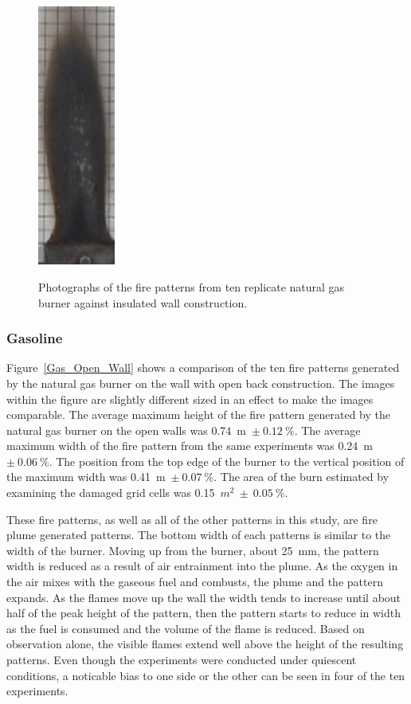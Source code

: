 \documentclass[twoside]{uocthesis}
\begin{document}
\begin{figure}[p]
	\includegraphics[width=1.0in]{../Figures/GBNG33} \\

	\caption[Photographs of the fire patterns from ten replicate natural gas burner against insulated wall construction]{Photographs of the fire patterns from ten replicate natural gas burner against insulated wall construction.}
	\label{NG_Insulated_Wall}
\end{figure}



\subsubsection{Gasoline}

Figure~\ref{Gas_Open_Wall} shows a comparison of the ten fire patterns generated by the natural gas burner on the wall with open back construction.  The images within the figure are slightly different sized in an effect to make the images comparable.
The average maximum height of the fire pattern generated by the natural gas burner on the open walls was 0.74~m~$\pm~0.12~\%$.  The average maximum width of the fire pattern from the same experiments was 0.24~m~$\pm~0.06~\%$.  The position from the top edge of the burner to the vertical position of the maximum width was 0.41~m~$\pm~0.07~\%$. The area of the burn estimated by examining the damaged grid cells was 0.15~$m^2~\pm~0.05~\%$.  

These fire patterns, as well as all of the other patterns in this study, are fire plume generated patterns. The bottom width of each patterns is similar to the width of the burner. Moving up from the burner, about 25~mm, the pattern width is reduced as a result of air entrainment into the plume.  As the oxygen in the air mixes with the gaseous fuel and combusts, the plume and the pattern expands.  As the flames move up the wall the width tends to increase until about half of the peak height of the pattern, then the pattern starts to reduce in width as the fuel is consumed and the volume of the flame is reduced.  Based on observation alone, the visible flames extend well above the height of the resulting patterns.  Even though the experiments were conducted under quiescent conditions, a noticable bias to one side or the other can be seen in four of the ten experiments.           
\end{document}
